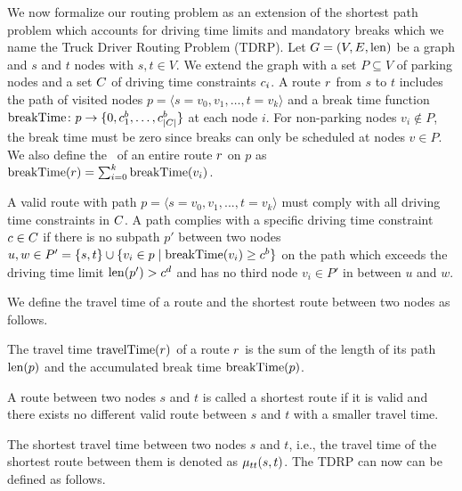 We now formalize our routing problem as an extension of the shortest path problem which accounts for driving time limits and mandatory breaks which we name the Truck Driver Routing Problem (TDRP). Let $G=(V,E,\operatorname{len})$ be a graph and $s$ and $t$ nodes with $s,t \in V$. We extend the graph with a set $P \subseteq V$ of parking nodes and a set $C$ of driving time constraints $c_i$. A route $r$ from $s$ to $t$ includes the path of visited nodes $p = \langle s=v_0,v_1,\dots,t=v_k \rangle$ and a break time function $\operatorname{breakTime}\colon p \rightarrow \{0,c_1^b,\dots,c_{|C|}^b\}$ at each node $i$. For non-parking nodes $v_i \notin P$, the break time must be zero since breaks can only be scheduled at nodes $v \in P$. We also define the \breakTime\ of an entire route $r$ on $p$ as $\operatorname{breakTime}(r) = \sum_{i=0}^{k}{\operatorname{breakTime}(v_i)}$.

\begin{definition}
	A valid route with path $p = \langle s=v_0,v_1,...,t=v_k \rangle$ must comply with all driving time constraints in $C$. A path complies with a specific driving time constraint $c \in C$ if there is no subpath $p'$ between two nodes $u,w \in P' = \{s,t\} \cup \{v_i \in p \mid \operatorname{breakTime}(v_i) \ge c^b\}$ on the path which exceeds the driving time limit $\operatorname{len}(p') > c^d$ and has no third node $v_i \in P'$ in between $u$ and $w$.
\end{definition}

We define the travel time of a route and the shortest route between two nodes as follows.

\begin{definition}
	The travel time $\operatorname{travelTime}(r)$ of a route $r$ is the sum of the length of its path $\operatorname{len}(p)$ and the accumulated break time $\operatorname{breakTime}(p)$.
\end{definition}

\begin{definition}
	A route between two nodes $s$ and $t$ is called a shortest route if it is valid and there exists no different valid route between $s$ and $t$ with a smaller travel time.
\end{definition}

The shortest travel time between two nodes $s$ and $t$, i.e., the travel time of the shortest route between them is denoted as $\mu_{tt}(s,t)$. The TDRP can now can be defined as follows.

